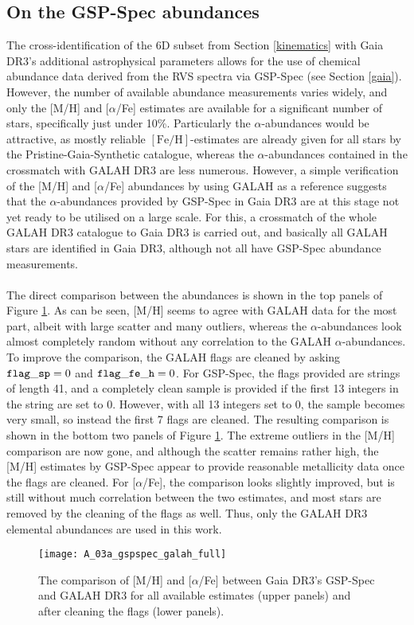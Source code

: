 \documentclass[a4paper,11pt]{article}
\begin{document}
\subsection{On the GSP-Spec abundances}\label{gspspec_app}
The cross-identification of the 6D subset from Section \ref{kinematics} with Gaia DR3's additional astrophysical parameters allows for the use of chemical abundance data derived from the RVS spectra via GSP-Spec (see Section \ref{gaia}). However, the number of available abundance measurements varies widely, and only the [M/H] and [$\alpha$/Fe] estimates are available for a significant number of stars, specifically just under 10\%. Particularly the $\alpha$-abundances would be attractive, as mostly reliable $\mathrm{[Fe/H]}$-estimates are already given for all stars by the Pristine-Gaia-Synthetic catalogue, whereas the $\alpha$-abundances contained in the crossmatch with GALAH DR3 are less numerous. However, a simple verification of the [M/H] and [$\alpha$/Fe] abundances by using GALAH as a reference suggests that the $\alpha$-abundances provided by GSP-Spec in Gaia DR3 are at this stage not yet ready to be utilised on a large scale. For this, a crossmatch of the whole GALAH DR3 catalogue to Gaia DR3 is carried out, and basically all GALAH stars are identified in Gaia DR3, although not all have GSP-Spec abundance measurements.\\ \\
%
The direct comparison between the abundances is shown in the top panels of Figure \ref{fig:gspspec_galah_full}. As can be seen, [M/H] seems to agree with GALAH data for the most part, albeit with large scatter and many outliers, whereas the $\alpha$-abundances look almost completely random without any correlation to the GALAH $\alpha$-abundances. To improve the comparison, the GALAH flags are cleaned by asking ${\tt flag\_sp}=0$ and ${\tt flag\_fe\_h}=0$. For GSP-Spec, the flags provided are strings of length 41, and a completely clean sample is provided if the first 13 integers in the string are set to 0. However, with all 13 integers set to 0, the sample becomes very small, so instead the first 7 flags are cleaned. The resulting comparison is shown in the bottom two panels of Figure \ref{fig:gspspec_galah_full}. The extreme outliers in the [M/H] comparison are now gone, and although the scatter remains rather high, the [M/H] estimates by GSP-Spec appear to provide reasonable metallicity data once the flags are cleaned. For [$\alpha$/Fe], the comparison looks slightly improved, but is still without much correlation between the two estimates, and most stars are removed by the cleaning of the flags as well. Thus, only the GALAH DR3 elemental abundances are used in this work.
%
\begin{figure}[H]
 \centering
 \texttt{[image: A\_03a\_gspspec\_galah\_full]}
 \caption[GSP-Spec vs. GALAH metallicity and $\alpha$-abundance]{The comparison of [M/H] and [$\alpha$/Fe] between Gaia DR3's GSP-Spec and GALAH DR3 for all available estimates (upper panels) and after cleaning the flags (lower panels).}
 \label{fig:gspspec_galah_full}
\end{figure}
%
\end{document}
